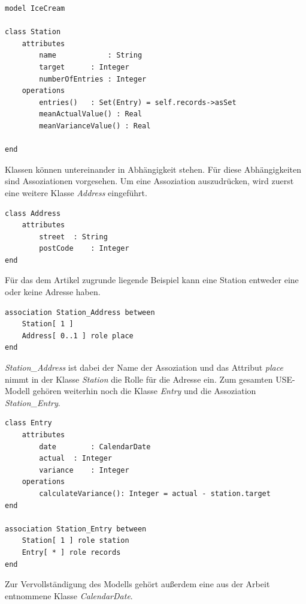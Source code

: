 \documentclass[a4paper,twoside]{article}
\begin{document}
\lstset{basicstyle=\tiny,style=myCustomUseStyle}
\begin{lstlisting}
model IceCream

class Station
	attributes
		name			: String
		target		: Integer
		numberOfEntries : Integer
	operations
		entries()	: Set(Entry) = self.records->asSet
		meanActualValue() : Real
		meanVarianceValue() : Real
		
end
\end{lstlisting}

Klassen können untereinander in Abhängigkeit stehen. Für diese Abhängigkeiten sind Assoziationen vorgesehen. Um eine Assoziation auszudrücken, wird zuerst eine weitere Klasse \textit{Address} eingeführt.

\begin{lstlisting}
class Address
	attributes
		street	: String
		postCode	: Integer
end
\end{lstlisting}

Für das dem Artikel zugrunde liegende Beispiel kann eine Station entweder eine oder keine Adresse haben.

\begin{lstlisting}
association Station_Address between
	Station[ 1 ] 
	Address[ 0..1 ] role place
end
\end{lstlisting}

\textit{Station\_Address} ist dabei der Name der Assoziation und das Attribut \textit{place} nimmt in der Klasse \textit{Station} die Rolle für die Adresse ein. Zum gesamten USE-Modell gehören weiterhin noch die Klasse \textit{Entry} und die Assoziation \textit{Station\_Entry}.

\begin{lstlisting}
class Entry
	attributes
		date		: CalendarDate
		actual	: Integer
		variance	: Integer
	operations
		calculateVariance(): Integer = actual - station.target	
end

association Station_Entry between
	Station[ 1 ] role station
	Entry[ * ] role records
end
\end{lstlisting}

Zur Vervollständigung des Modells gehört außerdem eine aus der Arbeit \cite{SilvaMasterThesis} entnommene Klasse \textit{CalendarDate}.
\end{document}
